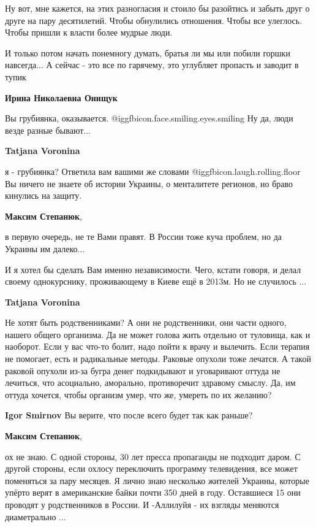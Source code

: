 \begin{itemize}
\begin{itemize}
Ну вот, мне кажется, на этих разногласия и стоило бы разойтись и забыть друг о
друге на пару десятилетий. Чтобы обнулились отношения. Чтобы все улеглось.
Чтобы пришли к власти более мудрые люди.

И только потом начать понемногу думать, братья ли мы или побили горшки
навсегда... А сейчас - это все по гарячему, это углубляет пропасть и заводит в
тупик

\textbf{Ирина Николаевна Онищук} 

Вы грубиянка, оказывается.  @igg{fbicon.face.smiling.eyes.smiling}  Ну да, люди
везде разные бывают...

\textbf{Tatjana Voronina} 

я - грубиянка? Ответила вам вашими же словами  @igg{fbicon.laugh.rolling.floor} 
Вы ничего не знаете об истории Украины, о менталитете регионов, но браво кинулись на защиту.

\textbf{Максим Степанюк}, 

в первую очередь, не те Вами правят. В России тоже куча проблем, но да Украины им далеко...

И я хотел бы сделать Вам именно независимости. Чего, кстати говоря, и делал
своему однокурснику, проживающему в Киеве ещё в 2013м. Но не случилось ...

\textbf{Tatjana Voronina} 

Не хотят быть родственниками? А они не родственники, они части одного, нашего
общего организма. Да не может голова жить отдельно от туловища, как и наоборот.
Если у вас что-то болит, надо пойти к врачу и вылечить. Если терапия не
помогает, есть и радикальные методы. Раковые опухоли тоже лечатся. А такой
раковой опухоли из-за бугра денег подкидывают и уговаривают оттуда не лечиться,
что асоциально, аморально, противоречит здравому смыслу. Да, им оттуда хочется,
чтобы организм умер, что же, умереть по их желанию?


\textbf{Igor Smirnov} Вы верите, что после всего будет так как раньше?

\textbf{Максим Степанюк}, 

ох не знаю. С одной стороны, 30 лет пресса пропаганды не подходит даром. С
другой стороны, если охлосу переключить программу телевидения, все может
поменяться за пару месяцев. Я лично знаю несколько жителей Украины, которые
упёрто верят в американские байки почти 350 дней в году. Оставшиеся 15 они
проводят у родственников в России. И -Аллилуйя - их взгляды меняются
диаметрально ...


\end{itemize}
\end{itemize}
